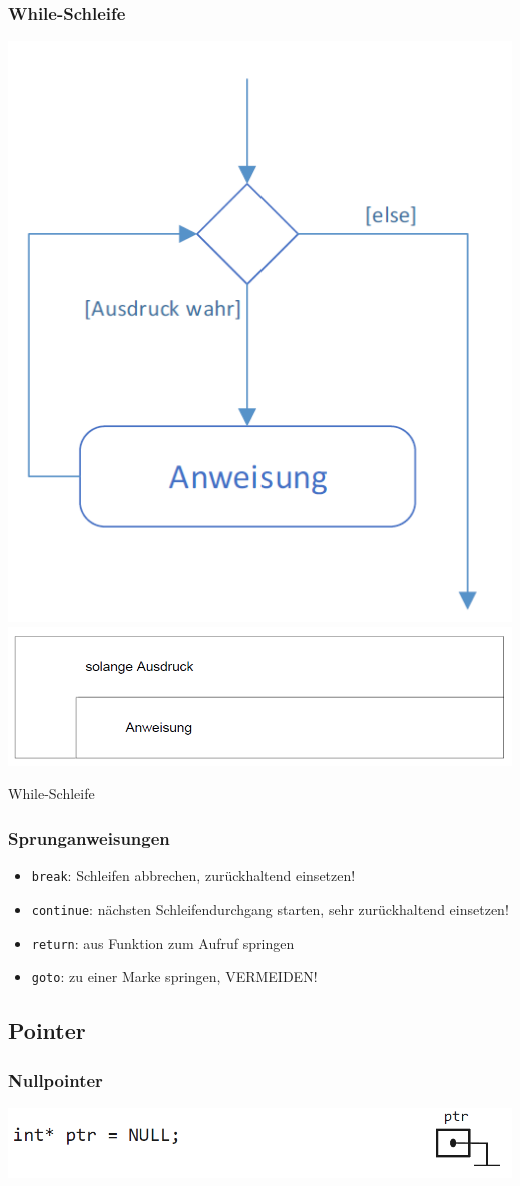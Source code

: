 		\subsubsection{While-Schleife}
			\begin{minipage}{.45\linewidth}
				\includegraphics[width=0.5\linewidth]{Bilder/while1.png}
				\includegraphics[width=0.5\linewidth]{Bilder/while2.png}
			\end{minipage}
			\hfill
			\begin{minipage}{.5\linewidth}
				While-Schleife
			\end{minipage}

		\subsubsection{Sprunganweisungen}
			\begin{itemize}
				\item \verb|break|: Schleifen abbrechen, zurückhaltend einsetzen!
				\item \verb|continue|: nächsten Schleifendurchgang starten, sehr zurückhaltend einsetzen!
				\item \verb|return|: aus Funktion zum Aufruf springen
				\item \verb|goto|: zu einer Marke springen, VERMEIDEN!
			\end{itemize}

	\subsection{Pointer}
		\subsubsection{Nullpointer}
			\begin{minipage}{1\linewidth}
				\includegraphics[width=0.95\linewidth]{Bilder/nullpointer.png}
			\end{minipage}

